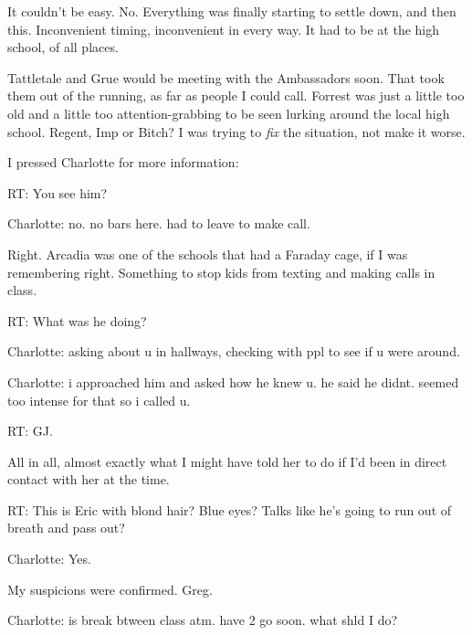 





It couldn't be easy.  No.  Everything was finally starting to settle down, and then this.  Inconvenient timing, inconvenient in every way.  It had to be at the high school, of all places.



Tattletale and Grue would be meeting with the Ambassadors soon.  That took them out of the running, as far as people I could call.  Forrest was just a little too old and a little too attention-grabbing to be seen lurking around the local high school.  Regent, Imp or Bitch?  I was trying to \emph{fix} the situation, not make it worse.



I pressed Charlotte for more information:



RT:
You see him?



Charlotte:
no.  no bars here. had to leave to make call.



Right.  Arcadia was one of the schools that had a Faraday cage, if I was remembering right.  Something to stop kids from texting and making calls in class.



RT:
What was he doing?



Charlotte:
asking about u in hallways, checking with ppl to see if u were around.



Charlotte:
i approached him and asked how he knew u.  he said he didnt.  seemed too intense for that so i called u.



RT:
GJ.



All in all, almost exactly what I might have told her to do if I'd been in direct contact with her at the time.



RT:
This is Eric with blond hair?  Blue eyes?  Talks like he's going to run out of breath and pass out?



Charlotte:
Yes.



My suspicions were confirmed.  Greg.



Charlotte:
is break btween class atm.  have 2 go soon.  what shld I do?



